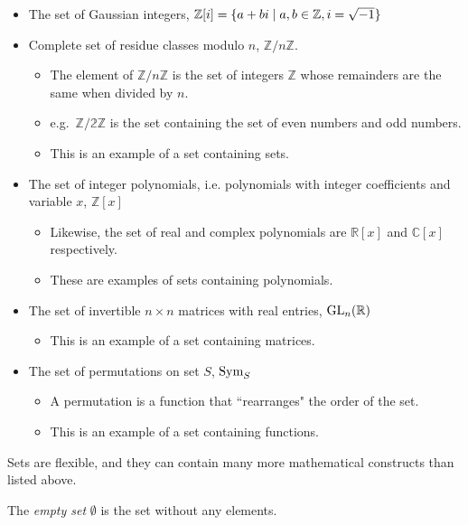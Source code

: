 \begin{itemize}
    \item The set of Gaussian integers, \(\mathbb{Z}[i]=\{a+bi\mid a,b\in\mathbb{Z},i=\sqrt{-1}\}\)
    \item Complete set of residue classes modulo \(n\), \(\mathbb{Z}/n\mathbb{Z}\).
    \begin{itemize}
        \item The element of \(\mathbb{Z}/n\mathbb{Z}\) is the set of integers \(\mathbb{Z}\) whose remainders are the same
        when divided by \(n\). 
        \item e.g.\ \(\mathbb{Z/2\mathbb{Z}}\) is the set containing the set of even numbers and odd numbers.
        \item This is an example of a set containing sets.
    \end{itemize}
    \item The set of integer polynomials, i.e. polynomials with integer coefficients and variable \(x\), \(\mathbb{Z}[x]\)
    \begin{itemize}
        \item Likewise, the set of real and complex polynomials are \(\mathbb{R}[x]\) and \(\mathbb{C}[x]\) respectively.
        \item These are examples of sets containing polynomials.
    \end{itemize}
    \item The set of invertible \(n\times n\) matrices with real entries, \(\text{GL}_{n}(\mathbb{R})\)
    \begin{itemize}
        \item This is an example of a set containing matrices.
    \end{itemize}
    \item The set of permutations on set \(S\), \(\text{Sym}_{S}\)
    \begin{itemize}
        \item A permutation is a function that ``rearranges" the order of the set.
        \item This is an example of a set containing functions.
    \end{itemize}
\end{itemize}
Sets are flexible, and they can contain many more mathematical constructs than listed above.

\bigskip
\begin{definition}
    The \emph{empty set} \(\emptyset\) is the set without any elements. 
\end{definition}


